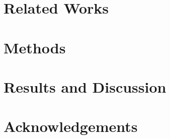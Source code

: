 \documentclass{article}
\begin{document}
\section{Related Works}

\section{Methods}

\section{Results and Discussion}

\section*{Acknowledgements}


%
%






  
\end{document}
